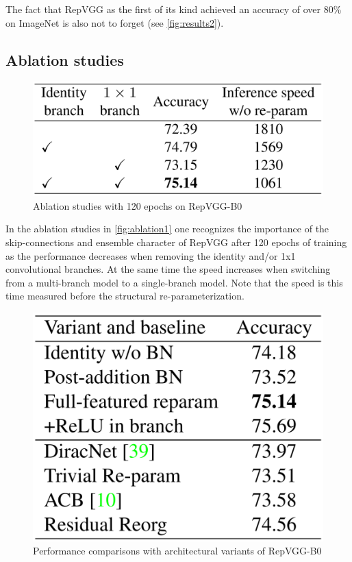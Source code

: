 The fact that RepVGG as the first of its kind achieved an accuracy of over 80\% on ImageNet is also not to forget (see \autoref{fig:results2}).

\subsection{Ablation studies}

\begin{figure}[t]
	\begin{center}
		\includegraphics[width=0.8\linewidth]{images/ablation1.PNG}
	\end{center}
	\caption{Ablation studies with 120 epochs on RepVGG-B0}
	\label{fig:ablation1}
\end{figure}

In the ablation studies in \autoref{fig:ablation1} one recognizes the importance of the skip-connections and ensemble character of RepVGG after 120 epochs of training as the performance decreases when removing the identity and/or 1x1 convolutional branches. At the same time the speed increases when switching from a multi-branch model to a single-branch model. Note that the speed is this time measured before the structural re-parameterization. 

\begin{figure}[t]
	\begin{center}
		\includegraphics[width=0.8\linewidth]{images/ablation2.PNG}
	\end{center}
	\caption{Performance comparisons with architectural variants of RepVGG-B0}
	\label{fig:ablation2}
\end{figure}

